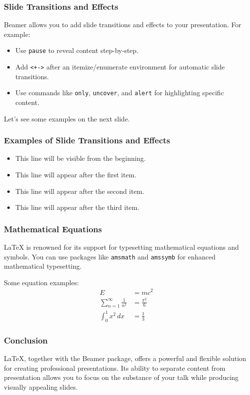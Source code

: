 \documentclass{beamer}
\begin{document}
\begin{frame}
  \frametitle{Slide Transitions and Effects}
  Beamer allows you to add slide transitions and effects to your presentation. For example:
  \begin{itemize}
    \item Use \texttt{pause} to reveal content step-by-step.
    \item Add \texttt{<+->} after an itemize/enumerate environment for automatic slide transitions.
    \item Use commands like \texttt{only}, \texttt{uncover}, and \texttt{alert} for highlighting specific content.
  \end{itemize}

  \vspace{0.5cm}
  
  Let's see some examples on the next slide.
\end{frame}


\begin{frame}
  \frametitle{Examples of Slide Transitions and Effects}
  \begin{itemize}
    \item This line will be visible from the beginning.
    \item This line will appear after the first item.
    \pause
    \item This line will appear after the second item.
    \item This line will appear after the third item.
  \end{itemize}
  
  \vspace{0.5cm}
  
\end{frame}


\begin{frame}
  \frametitle{Mathematical Equations}
  LaTeX is renowned for its support for typesetting mathematical equations and symbols. You can use packages like \texttt{amsmath} and \texttt{amssymb} for enhanced mathematical typesetting.

  \vspace{0.5cm}

  Some equation examples:
  \begin{align*}
    E &= mc^2 \\
    \sum_{n=1}^{\infty} \frac{1}{n^2} &= \frac{\pi^2}{6} \\
    \int_{0}^{1} x^2 \, dx &= \frac{1}{3}
  \end{align*}
\end{frame}


\begin{frame}
  \frametitle{Conclusion}
  LaTeX, together with the Beamer package, offers a powerful and flexible solution for creating professional presentations. Its ability to separate content from presentation allows you to focus on the substance of your talk while producing visually appealing slides.
\end{frame}
\end{document}

